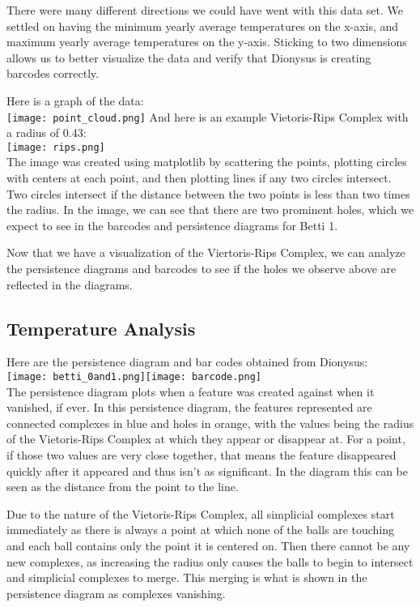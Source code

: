 \documentclass[12pt]{report}
\begin{document}
There were many different directions we could have went with this data set. We settled on having the minimum yearly average temperatures on the x-axis, and maximum yearly average temperatures on the y-axis. Sticking to two dimensions allows us to better visualize the data and verify that Dionysus is creating barcodes correctly. \par
Here is a graph of the data:\\
\texttt{[image: point\_cloud.png]}
\clearpage
And here is an example Vietoris-Rips Complex with a radius of 0.43:\\
\texttt{[image: rips.png]}\\
The image was created using matplotlib by scattering the points, plotting circles with centers at each point, and then plotting lines if any two circles intersect. Two circles intersect if the distance between the two points is less than two times the radius. In the image, we can see that there are two prominent holes, which we expect to see in the barcodes and persistence diagrams for Betti 1.\par
Now that we have a visualization of the Viertoris-Rips Complex, we can analyze the persistence diagrams and barcodes to see if the holes we observe above are reflected in the diagrams.
\clearpage
\subsection*{Temperature Analysis}
Here are the persistence diagram and bar codes obtained from Dionysus:\\
\texttt{[image: betti\_0and1.png]}\texttt{[image: barcode.png]}\\
The persistence diagram plots when a feature was created against when it vanished, if ever. In this persistence diagram, the features represented are connected complexes in blue and holes in orange, with the values being the radius of the Vietoris-Rips Complex at which they appear or disappear at. For a point, if those two values are very close together, that means the feature disappeared quickly after it appeared and thus isn't as significant. In the diagram this can be seen as the distance from the point to the line. \par

Due to the nature of the Vietoris-Rips Complex, all simplicial complexes start immediately as there is always a point at which none of the balls are touching and each ball contains only the point it is centered on. Then there cannot be any new complexes, as increasing the radius only causes the balls to begin to intersect and simplicial complexes to merge. This merging is what is shown in the persistence diagram as complexes vanishing. 
\end{document}
